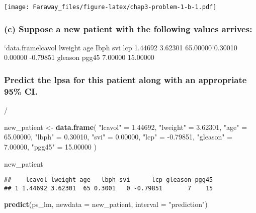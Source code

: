 \documentclass[
]{article}
\newenvironment{Shaded}{\begin{snugshade}}{\end{snugshade}}
\newcommand{\DataTypeTok}[1]{\textcolor[rgb]{0.13,0.29,0.53}{#1}}
\newcommand{\FloatTok}[1]{\textcolor[rgb]{0.00,0.00,0.81}{#1}}
\newcommand{\KeywordTok}[1]{\textcolor[rgb]{0.13,0.29,0.53}{\textbf{#1}}}
\newcommand{\NormalTok}[1]{#1}
\newcommand{\StringTok}[1]{\textcolor[rgb]{0.31,0.60,0.02}{#1}}
\begin{document}
\texttt{[image: Faraway\_files/figure-latex/chap3-problem-1-b-1.pdf]}

\hypertarget{c-suppose-a-new-patient-with-the-following-values-arrives}{%
\subsubsection{(c) Suppose a new patient with the following values
arrives:}\label{c-suppose-a-new-patient-with-the-following-values-arrives}}

`data.framelcavol lweight age Ibph svi lcp 1.44692 3.62301 65.00000
0.30010 0.00000 -0.79851 gleason pgg45 7.00000 15.00000

\hypertarget{predict-the-lpsa-for-this-patient-along-with-an-appropriate-95-ci.}{%
\subsubsection{Predict the lpsa for this patient along with an
appropriate 95\%
CI.}\label{predict-the-lpsa-for-this-patient-along-with-an-appropriate-95-ci.}}

/

\begin{Shaded}
\begin{Highlighting}[]
\NormalTok{new_patient <-}\StringTok{ }\KeywordTok{data.frame}\NormalTok{(}
  \StringTok{"lcavol"}\NormalTok{ =}\StringTok{ }\FloatTok{1.44692}\NormalTok{,}
  \StringTok{"lweight"}\NormalTok{ =}\StringTok{ }\FloatTok{3.62301}\NormalTok{,}
  \StringTok{"age"}\NormalTok{ =}\StringTok{ }\FloatTok{65.00000}\NormalTok{,}
  \StringTok{"lbph"}\NormalTok{ =}\StringTok{ }\FloatTok{0.30010}\NormalTok{,}
  \StringTok{"svi"}\NormalTok{ =}\StringTok{ }\FloatTok{0.00000}\NormalTok{,}
  \StringTok{"lcp"}\NormalTok{ =}\StringTok{ }\FloatTok{-0.79851}\NormalTok{,}
  \StringTok{"gleason"}\NormalTok{ =}\StringTok{ }\FloatTok{7.00000}\NormalTok{,}
  \StringTok{"pgg45"}\NormalTok{ =}\StringTok{ }\FloatTok{15.00000}
\NormalTok{)}

\NormalTok{new_patient}
\end{Highlighting}
\end{Shaded}

\begin{verbatim}
##    lcavol lweight age   lbph svi      lcp gleason pgg45
## 1 1.44692 3.62301  65 0.3001   0 -0.79851       7    15
\end{verbatim}

\begin{Shaded}
\begin{Highlighting}[]
\KeywordTok{predict}\NormalTok{(ps_lm, }\DataTypeTok{newdata =}\NormalTok{ new_patient, }\DataTypeTok{interval =} \StringTok{"prediction"}\NormalTok{)}
\end{Highlighting}
\end{Shaded}
\end{document}
